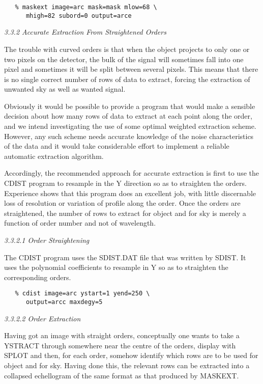 \begin{verbatim}
   % maskext image=arc mask=mask mlow=68 \
      mhigh=82 subord=0 output=arce
\end{verbatim}


\goodbreak
\vspace{12pt}
{\it 3.3.2 Accurate Extraction From Straightened Orders}

The trouble with curved orders is that when the object projects to only one or
two pixels on the detector, the bulk of the signal will sometimes fall into one
pixel and sometimes it will be split between several pixels. This means that
there is no single correct number of rows of data to extract, forcing the
extraction of unwanted sky as well as wanted signal.

Obviously it would be possible to provide a program that would make a sensible
decision about how many rows of data to extract at each point along the order,
and we intend investigating the use of some optimal weighted extraction scheme.
However, any such scheme needs accurate knowledge of the noise characteristics
of the data and it would take considerable effort to implement a reliable
automatic extraction algorithm.

Accordingly, the recommended approach for accurate extraction is first to use
the CDIST program to resample in the Y direction so as to straighten the
orders. Experience shows that this program does an excellent job, with little
discernable loss of resolution or variation of profile along the order. Once
the orders are straightened, the number of rows to extract for object and for
sky is merely a function of order number and not of wavelength.


\goodbreak
\vspace{12pt}
{\it 3.3.2.1 Order Straightening}

The CDIST program uses the SDIST.DAT file that was written by SDIST. It uses
the polynomial coefficients to resample in Y so as to straighten the
corresponding orders.

\begin{verbatim}
   % cdist image=arc ystart=1 yend=250 \
      output=arcc maxdegy=5
\end{verbatim}


\goodbreak
\vspace{12pt}
{\it 3.3.2.2 Order Extraction}

Having got an image with straight orders, conceptually one wants to take
a YSTRACT through somewhere near the centre of the orders, display with
SPLOT and then, for each order, somehow identify which rows are to be used
for object and for sky. Having done this, the relevant rows can be extracted
into a collapsed echellogram of the same format as that produced by MASKEXT.

